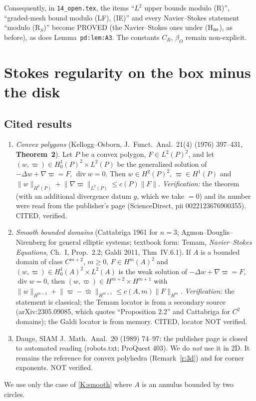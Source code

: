 \documentclass[11pt,reqno]{amsart}
\theoremstyle{plain}
\theoremstyle{definition}
\newcommand{\norm}[1]{\lVert #1\rVert}
\renewcommand{\div}{\operatorname{div}}
\begin{document}
\noindent Consequently, in \texttt{14\_open.tex}, the items ``$L^2$ upper bounds modulo (R)'', ``graded-mesh bound modulo (LF), (IE)'' and every Navier--Stokes statement ``modulo (R$_S$)'' become PROVED (the Navier--Stokes ones under (H$_{\rm ns}$), as before), as does Lemma~\texttt{pd:lem:A3}. The constants $C_R$, $\beta_O$ remain non-explicit.

\section{Stokes regularity on the box minus the disk}\label{s:R}

\subsection{Cited results}
\begin{enumerate}[label=(K\arabic*)]
\item\label{K:KO} \emph{Convex polygons} (Kellogg--Osborn, J.\ Funct.\ Anal.\ 21(4) (1976) 397--431, \textbf{Theorem~2}). Let $P$ be a convex polygon, $F\in L^2(P)^2$, and let $(w,\varpi)\in H^1_0(P)^2\times L^2(P)$ be the generalized solution of $-\Delta w+\nabla\varpi=F$, $\div w=0$. Then $w\in H^2(P)^2$, $\varpi\in H^1(P)$ and $\norm w_{H^2(P)}+\norm{\nabla\varpi}_{L^2(P)}\le c(P)\norm F$. \emph{Verification:} the theorem (with an additional divergence datum $g$, which we take $=0$) and its number were read from the publisher's page (ScienceDirect, pii 0022123676900355). CITED, verified.
\item\label{K:smooth} \emph{Smooth bounded domains} (Cattabriga 1961 for $n=3$; Agmon--Douglis--Nirenberg for general elliptic systems; textbook form: Temam, \emph{Navier--Stokes Equations}, Ch.~I, Prop.~2.2; Galdi 2011, Thm~IV.6.1). If $A$ is a bounded domain of class $C^{m+2}$, $m\ge0$, $F\in H^m(A)^2$ and $(w,\varpi)\in H^1_0(A)^2\times L^2(A)$ is the weak solution of $-\Delta w+\nabla\varpi=F$, $\div w=0$, then $(w,\varpi)\in H^{m+2}\times H^{m+1}$ with $\norm w_{H^{m+2}}+\norm{\varpi-\bar\varpi}_{H^{m+1}}\le c(A,m)\norm F_{H^m}$. \emph{Verification:} the statement is classical; the Temam locator is from a secondary source (arXiv:2305.09085, which quotes ``Proposition 2.2'' and Cattabriga for $C^2$ domains); the Galdi locator is from memory. CITED, locator NOT verified.
\item\label{K:dauge} Dauge, SIAM J.\ Math.\ Anal.\ 20 (1989) 74--97: the publisher page is closed to automated reading (robots.txt; ProQuest 403). We do \emph{not} use it in 2D. It remains the reference for convex polyhedra (Remark~\ref{r:3d}) and for corner exponents. NOT verified.
\end{enumerate}
We use only the case of \ref{K:smooth} where $A$ is an annulus bounded by two circles.
\end{document}
